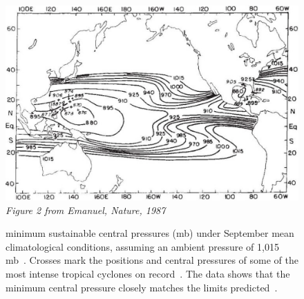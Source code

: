 \begin{figure}[htb!]
\centering
\includegraphics[width=1\linewidth]{images/e87-slimmed-verif.png}\\
\textit{Figure 2 from Emanuel, Nature, 1987~\cite{emanuel1987dependence}}
\caption{minimum sustainable central pressures (mb) under September mean
climatological conditions, assuming an ambient pressure of 1,015 mb~\cite{emanuel1986air}.
Crosses mark the positions and central pressures of some of the most intense
tropical cyclones on record~\cite{anthes2016tropical}.
The data shows that the minimum central pressure
closely matches the limits predicted~\cite{emanuel1986air}. }
\label{fig:emanuel87}
\end{figure}

